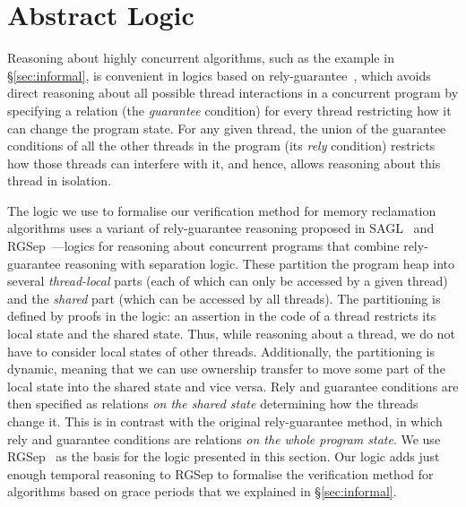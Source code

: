 %

\section{Abstract Logic\label{sec:logic}}

Reasoning about highly concurrent algorithms, such as the example in
\S\ref{sec:informal}, is convenient in logics based on
rely-guarantee~\cite{Jones83,Pnueli}, which avoids direct reasoning about all
possible thread interactions in a concurrent program by specifying a relation
(the {\em guarantee} condition) for every thread restricting how it can change
the program state. For any given thread, the union of the guarantee conditions
of all the other threads in the program (its {\em rely} condition) restricts how
those threads can interfere with it, and hence, allows reasoning about this
thread in isolation.  

The logic we use to formalise our verification method for memory reclamation
algorithms uses a variant of rely-guarantee reasoning proposed in
SAGL~\cite{sagl} and RGSep~\cite{rgsep}---logics for reasoning about concurrent
programs that combine rely-guarantee reasoning with separation logic. These
partition the program heap into several {\em thread-local} parts (each of which
can only be accessed by a given thread) and the {\em shared} part (which can be
accessed by all threads). The partitioning is defined by proofs in the logic: an
assertion in the code of a thread restricts its local state and the shared
state. Thus, while reasoning about a thread, we do not have to consider local
states of other threads. Additionally, the partitioning is dynamic, meaning that
we can use ownership transfer to move some part of the local state into the
shared state and vice versa. Rely and guarantee conditions are then specified as
relations {\em on the shared state} determining how the threads change it. This
is in contrast with the original rely-guarantee method, in which rely and
guarantee conditions are relations {\em on the whole program state}.  We use
RGSep~\cite{rgsep} as the basis for the logic presented in this section. Our
logic adds just enough temporal reasoning to RGSep to formalise the 
verification method for algorithms based on grace periods that we explained in
\S\ref{sec:informal}. 


